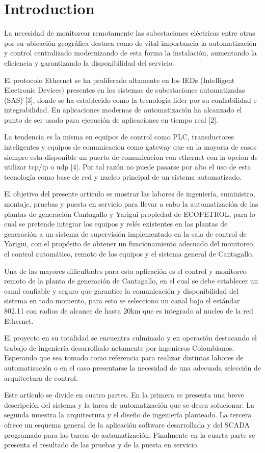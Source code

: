 
\section{Introduction}

La necesidad de monitorear remotamente las subestaciones eléctricas
entre otras por su ubicación geográfica destaca como de vital
importancia la automatización y control centralizado modernizando de
esta forma la instalación, aumentando la eficiencia y garantizando
la disponibilidad del servicio.

El protocolo Ethernet se ha proliferado altamente en los IEDs 
(Intelligent Electronic Devices) presentes en los sistemas de 
subestaciones automatizadas (SAS) [3], donde se ha establecido 
como la tecnología lider por su confiabilidad e integrabilidad.
En aplicaciones modernas de automatización ha alcanzado el 
punto de ser usado para ejecución de aplicaciones en tiempo real [2].

La tendencia es la misma en equipos de control como PLC, transductores
inteligentes y equipos de comunicacion como gateway que en la mayoria de 
casos siempre esta disponible un puerto de comunicacion con ethernet con
la opcion de utilizar tcp/ip o udp [4]. Por tal razón no puede pasarse por
alto el uso de esta tecnología como base de red y nucleo principal de un
sistema automatizado.

El objetivo del presente artículo es mostrar las labores de ingeniería,
suministro, montaje, pruebas y puesta en servicio para llevar a cabo la 
automatización de las plantas de generación Cantagallo y Yarigui propiedad de 
ECOPETROL, para lo cual se pretende integrar los equipos y relés existentes 
en las plantas de generación a un sistema de supervisión implementado en la 
sala de control de Yarigui, con el propósito de obtener un funcionamiento 
adecuado del monitoreo, el control automático, remoto de los equipos y el 
sistema general de Cantagallo.

Una de las mayores dificultades para esta aplicación es el control y monitoreo 
remoto de la planta de generación de Cantagallo,  en el cual se debe establecer 
un canal confiable y seguro que garantice la comunicación y disponibilidad del 
sistema en todo momento, para esto se selecciono un canal bajo el estándar 802.11 
con radios de alcance de hasta 20km que es integrado al nucleo de la red Ethernet.

El proyecto en su totalidad se encuentra culminado y en operación destacando el 
trabajo de ingeniería desarrollado netamente por ingenieros Colombianos. Esperando 
que sea tomado como referencia para realizar distintas labores de automatización o 
en el caso presentarse la necesidad de una adecuada selección de arquitectura de control.

Este artículo se divide en cuatro partes. En la primera se presenta una breve descripción 
del sistema y la tarea de automatización que se desea solucionar. La segunda muestra la 
arquitectura y el diseño de ingeniería planteado.  La tercera ofrece un esquema general 
de la aplicación software desarrollada y del SCADA programado para las tareas de 
automatización. Finalmente en la cuarta parte se presenta el resultado de las pruebas 
y de la puesta en servicio.
